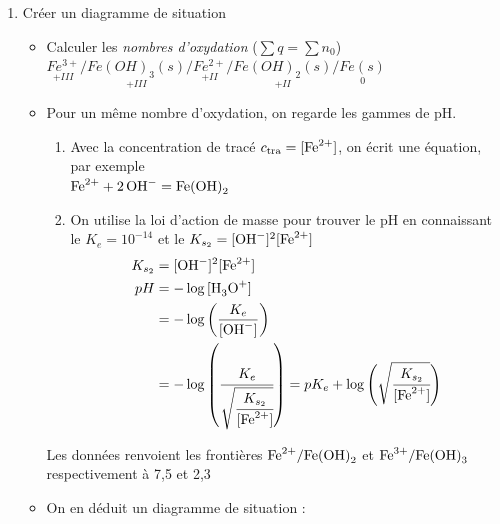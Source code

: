 \documentclass[11pt,a4paper,fleqn,pdftex]{report}
\begin{document}
\begin{enumerate}
	\item	Créer un diagramme de situation
	\begin{itemize}	
		\item Calculer les \emph{nombres d'oxydation} ($\sum q = \sum n_0$) \hfill \\
		$\underset{+III}{Fe^{3+}}/\underset{+III}{Fe(OH)_3 (s)}/\underset{+II}{Fe^{2+}}/\underset{+II}{Fe(OH)_2 (s)}/\underset{0}{Fe (s)}$
		\item Pour un même nombre d'oxydation, on regarde les gammes de pH. 
        \begin{enumerate}
          \item Avec la concentration de tracé $c_{\text{tra}} = [\ce{Fe^2+}]$, on écrit une équation, par exemple \\
          $\ce{Fe^2+ + 2OH- = Fe(OH)2}$
          \item On utilise la loi d'action de masse pour trouver le pH en connaissant le $K_e = 10^{-14}$ et le $K_{s_2}=[\ce{OH-}]^2[\ce{Fe^2+}] $\\
                \begin{align*}
                  K_{s_2} &= [\ce{OH-}]^2[\ce{Fe^2+}]\\
                  pH      &= -\log{[\ce{H3O+}]}\\
                          &= -\log \left( \dfrac{K_e}{[\ce{OH-}]} \right) \\
                          &= -\log \left( \cfrac{K_e}{\sqrt{\cfrac{K_{s_2}}{[\ce{Fe^2+}]}}} \right) = pK_e +\log \left( \sqrt{\cfrac{K_{s_2}}{[\ce{Fe^2+}]}} \right)
                \end{align*}
        \end{enumerate}
        Les données renvoient les frontières $\ce{Fe^2+}/\ce{Fe(OH)2}$ et $\ce{Fe^3+}/\ce{Fe(OH)3}$ respectivement à 7,5 et 2,3
    \item On en déduit un diagramme de situation : \\
\end{itemize}
\end{enumerate}
\end{document}
